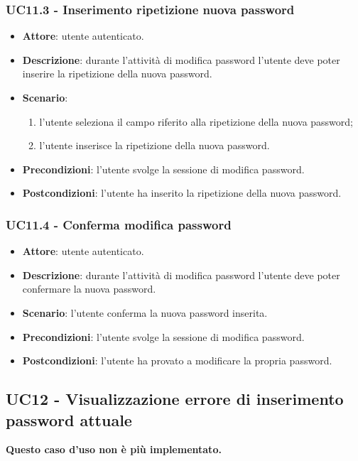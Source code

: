 \subsubsection{UC11.3 - Inserimento ripetizione nuova password}
\begin{itemize}
    \item \textbf{Attore}: utente autenticato.
    \item \textbf{Descrizione}: durante l'attività di modifica password l'utente deve poter inserire la ripetizione della nuova password.
    \item \textbf{Scenario}:
    \begin{enumerate}
        \item l'utente seleziona il campo riferito alla ripetizione della nuova password;
        \item l'utente inserisce la ripetizione della nuova password.
    \end{enumerate}

    \item \textbf{Precondizioni}: l'utente svolge la sessione di modifica password.
    \item \textbf{Postcondizioni}: l'utente ha inserito la ripetizione della nuova password.
\end{itemize}

\subsubsection{UC11.4 - Conferma modifica password}
\begin{itemize}
    \item \textbf{Attore}: utente autenticato.
    \item \textbf{Descrizione}: durante l'attività di modifica password l'utente deve poter confermare la nuova password.
    \item \textbf{Scenario}: l'utente conferma la nuova password inserita. 
    \item \textbf{Precondizioni}: l'utente svolge la sessione di modifica password.
    \item \textbf{Postcondizioni}: l'utente ha provato a modificare la propria password.
\end{itemize}

\subsection{UC12 - Visualizzazione errore di inserimento password attuale}
\textbf{Questo caso d'uso non è più implementato.}

